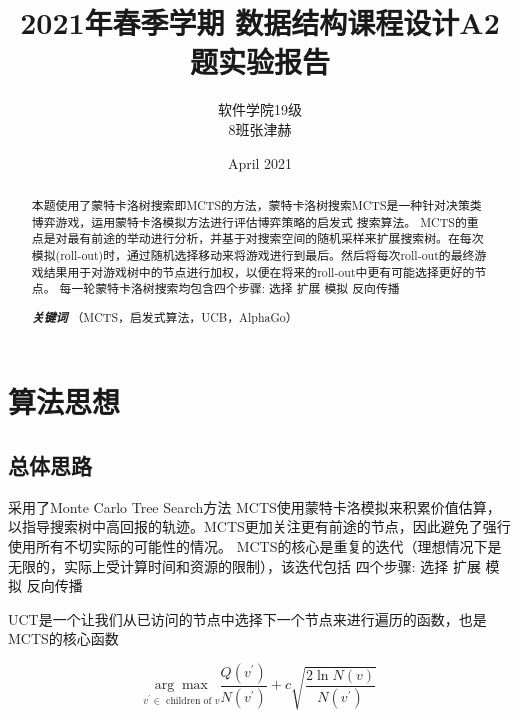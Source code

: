 \documentclass{ctexrep}
\title{2021年春季学期
数据结构课程设计A2题实验报告
}
\author{软件学院19级
    
    8班张津赫}
\date{April 2021}
\providecommand{\keywords}[1]
{
  \small	
  \textbf{\textit{关键词}} #1
}
\begin{document}
\maketitle

\begingroup
    \fontsize{14pt}{16pt}\selectfont
      
       
    
\begin{abstract}
     \hspace{1cm}本题使用了蒙特卡洛树搜索即MCTS的方法，蒙特卡洛树搜索MCTS是一种针对决策类博弈游戏，运用蒙特卡洛模拟方法进行评估博弈策略的启发式
搜索算法。
     MCTS的重点是对最有前途的举动进行分析，并基于对搜索空间的随机采样来扩展搜索树。在每次模拟(roll-out)时，通过随机选择移动来将游戏进行到最后。然后将每次roll-out的最终游戏结果用于对游戏树中的节点进行加权，以便在将来的roll-out中更有可能选择更好的节点。
每一轮蒙特卡洛树搜索均包含四个步骤: 选择 \hspace{0.3cm}扩展\hspace{0.3cm} 模拟 \hspace{0.3cm}反向传播

\vspace{1cm}\hspace{0.3cm}\keywords{\large（MCTS，启发式算法，UCB，AlphaGo）}



\end{abstract}

\endgroup



\maketitle  %
\tableofcontents  %
\chapter{算法思想}
\section{总体思路}
采用了Monte Carlo Tree Search方法 
MCTS使用蒙特卡洛模拟来积累价值估算，以指导搜索树中高回报的轨迹。MCTS更加关注更有前途的节点，因此避免了强行使用所有不切实际的可能性的情况。
MCTS的核心是重复的迭代（理想情况下是无限的，实际上受计算时间和资源的限制），该迭代包括 四个步骤: 选择 扩展 模拟 反向传播


UCT是一个让我们从已访问的节点中选择下一个节点来进行遍历的函数，也是MCTS的核心函数


\begin{equation}\label{eq:eq1}
\underset{v^{\prime} \in \text { children of } v}{\arg \max } \frac{Q\left(v^{\prime}\right)}{N\left(v^{\prime}\right)}+c \sqrt{\frac{2 \ln N(v)}{N\left(v^{\prime}\right)}}\end{equation}
\end{document}
